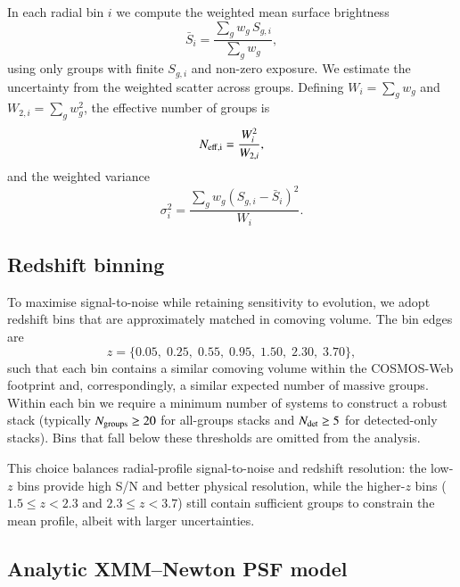 \documentclass{aa}
\begin{document}
\begin{appendix}
In each radial bin $i$ we compute the weighted mean surface brightness
\begin{equation}
\bar{S}_i = \frac{\sum_g w_g\, S_{g,i}}{\sum_g w_g},
\label{eq:Sbar}
\end{equation}
using only groups with finite $S_{g,i}$ and non-zero exposure. We estimate the uncertainty from the weighted scatter across groups. Defining $W_i = \sum_g w_g$ and $W_{2,i} = \sum_g w_g^2$, the effective number of groups is
\begin{equation}
N_{\rm eff,i} = \frac{W_i^2}{W_{2,i}},
\label{eq:Neff}
\end{equation}
and the weighted variance
\begin{equation}
\sigma_i^2 = \frac{\sum_g w_g \left(S_{g,i} - \bar{S}_i\right)^2}{W_i}.
\label{eq:sigma2}
\end{equation}

\subsection{Redshift binning}

To maximise signal-to-noise while retaining sensitivity to evolution, we adopt redshift bins that are approximately matched in comoving volume. The bin edges are
\begin{equation}
z = \{0.05,\; 0.25,\; 0.55,\; 0.95,\; 1.50,\; 2.30,\; 3.70\},
\label{eq:zbins}
\end{equation}
such that each bin contains a similar comoving volume within the COSMOS-Web footprint and, correspondingly, a similar expected number of massive groups. Within each bin we require a minimum number of systems to construct a robust stack (typically $N_{\rm groups} \geq 20$ for all-groups stacks and $N_{\rm det} \geq 5$ for detected-only stacks). Bins that fall below these thresholds are omitted from the analysis.

This choice balances radial-profile signal-to-noise and redshift resolution: the low-$z$ bins provide high S/N and better physical resolution, while the higher-$z$ bins ($1.5 \leq z < 2.3$ and $2.3 \leq z < 3.7$) still contain sufficient groups to constrain the mean profile, albeit with larger uncertainties.

\subsection{Analytic XMM--Newton PSF model}


\end{appendix}
\end{document}
